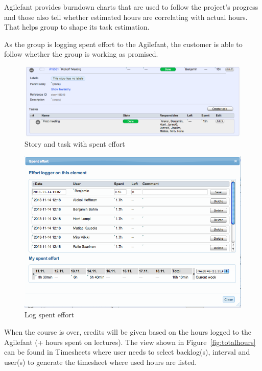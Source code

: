 Agilefant provides burndown charts that are used to follow the project's progress and those also tell whether estimated hours are correlating with actual hours. That helps group to shape its task estimation.

As the group is logging spent effort to the Agilefant, the customer is able to follow whether the group is working as promised. 

\begin{figure}[H]
\centering
\includegraphics[width=1\textwidth]{imgs/spenteffort1.png}
\caption{Story and task with spent effort}
\label{fig:spenteffort1}
\end{figure}


\begin{figure}[H]
\centering
\includegraphics[width=1\textwidth]{imgs/spenteffort2.png}
\caption{Log spent effort}
\label{fig:spenteffort2}
\end{figure}

When the course is over, credits will be given based on the hours logged to the 
Agilefant (+ hours spent on lectures). The view shown in 
Figure~\ref{fig:totalhours} can be found in Timesheets where user needs to 
select backlog(s), interval and user(s) to generate the timesheet where used 
hours are listed.

